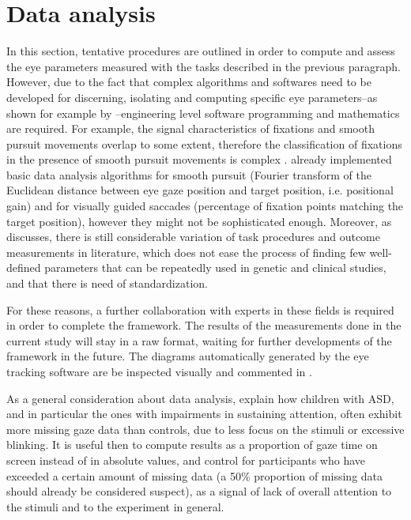 \section{Data analysis}
\label{sec:fwkdataanalysis}

In this section, tentative procedures are outlined in order to compute and assess the eye parameters measured with the tasks described in the previous paragraph. However, due to the fact that complex algorithms and softwares need to be developed for discerning, isolating and computing specific eye parameters–as shown for example by \cite{giordano2017eyetrackersystem,jansson2013smoothpursuit,larsson2015detection}–engineering level software programming and mathematics are required. For example, the signal characteristics of fixations and smooth pursuit movements overlap to some extent, therefore the classification of fixations in the presence of smooth pursuit movements is complex \citep{larsson2015detection}. \cite{giordano2017eyetrackersystem} already implemented basic data analysis algorithms for smooth pursuit (Fourier transform of the Euclidean distance between eye gaze position and target position, i.e. positional gain) and for visually guided saccades (percentage of fixation points matching the target position), however they might not be sophisticated enough. Moreover, as \cite{smyrnis2008guidelines} discusses, there is still considerable variation of task procedures and outcome measurements in literature, which does not ease the process of finding few well-defined parameters that can be repeatedly used in genetic and clinical studies, and that there is need of standardization.

For these reasons, a further collaboration with experts in these fields is required in order to complete the framework. The results of the measurements done in the current study will stay in a raw format, waiting for further developments of the framework in the future. The diagrams automatically generated by the eye tracking software are be inspected visually and commented in .

As a general consideration about data analysis, \cite{sasson2012children} explain how children with ASD, and in particular the ones with impairments in sustaining attention, often exhibit more missing gaze data than controls, due to less focus on the stimuli or excessive blinking. It is useful then to compute results as a proportion of gaze time on screen instead of in absolute values, and control for participants who have exceeded a certain amount of missing data (a 50\% proportion of missing data should already be considered suspect), as a signal of lack of overall attention to the stimuli and to the experiment in general.


